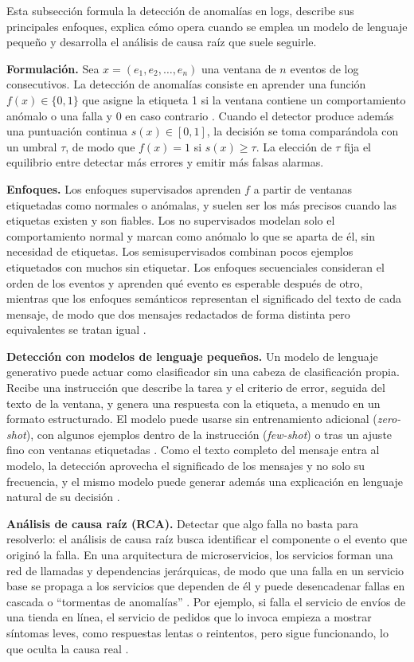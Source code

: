 Esta subsección formula la detección de anomalías en logs, describe sus principales enfoques, explica cómo opera cuando se emplea un modelo de lenguaje pequeño y desarrolla el análisis de causa raíz que suele seguirle.

\textbf{Formulación.} Sea $x = (e_1, e_2, \ldots, e_n)$ una ventana de $n$ eventos de log consecutivos. La detección de anomalías consiste en aprender una función $f(x) \in \{0, 1\}$ que asigne la etiqueta 1 si la ventana contiene un comportamiento anómalo o una falla y 0 en caso contrario \cite{he2021_survey}. Cuando el detector produce además una puntuación continua $s(x) \in [0, 1]$, la decisión se toma comparándola con un umbral $\tau$, de modo que $f(x) = 1$ si $s(x) \geq \tau$. La elección de $\tau$ fija el equilibrio entre detectar más errores y emitir más falsas alarmas.

\textbf{Enfoques.} Los enfoques supervisados aprenden $f$ a partir de ventanas etiquetadas como normales o anómalas, y suelen ser los más precisos cuando las etiquetas existen y son fiables. Los no supervisados modelan solo el comportamiento normal y marcan como anómalo lo que se aparta de él, sin necesidad de etiquetas. Los semisupervisados combinan pocos ejemplos etiquetados con muchos sin etiquetar. Los enfoques secuenciales consideran el orden de los eventos y aprenden qué evento es esperable después de otro, mientras que los enfoques semánticos representan el significado del texto de cada mensaje, de modo que dos mensajes redactados de forma distinta pero equivalentes se tratan igual \cite{jiang2021_aiops}.

\textbf{Detección con modelos de lenguaje pequeños.} Un modelo de lenguaje generativo puede actuar como clasificador sin una cabeza de clasificación propia. Recibe una instrucción que describe la tarea y el criterio de error, seguida del texto de la ventana, y genera una respuesta con la etiqueta, a menudo en un formato estructurado. El modelo puede usarse sin entrenamiento adicional (\textit{zero-shot}), con algunos ejemplos dentro de la instrucción (\textit{few-shot}) o tras un ajuste fino con ventanas etiquetadas \cite{liu2024_logprompt}. Como el texto completo del mensaje entra al modelo, la detección aprovecha el significado de los mensajes y no solo su frecuencia, y el mismo modelo puede generar además una explicación en lenguaje natural de su decisión \cite{lim2025_logadreft}.

\textbf{Análisis de causa raíz (RCA).} Detectar que algo falla no basta para resolverlo: el análisis de causa raíz busca identificar el componente o el evento que originó la falla. En una arquitectura de microservicios, los servicios forman una red de llamadas y dependencias jerárquicas, de modo que una falla en un servicio base se propaga a los servicios que dependen de él y puede desencadenar fallas en cascada o ``tormentas de anomalías'' \cite{wang2024_rca}. Por ejemplo, si falla el servicio de envíos de una tienda en línea, el servicio de pedidos que lo invoca empieza a mostrar síntomas leves, como respuestas lentas o reintentos, pero sigue funcionando, lo que oculta la causa real \cite{pedroso2025_maia}.

